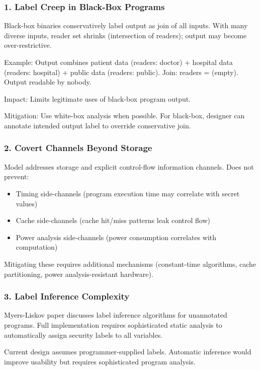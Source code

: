 \subsubsection{1. Label Creep in Black-Box Programs}

Black-box binaries conservatively label output as join of all inputs. With many diverse inputs, reader set shrinks (intersection of readers); output may become over-restrictive.

Example: Output combines patient data (readers: {doctor}) + hospital data (readers: {hospital}) + public data (readers: {public}). Join: readers = {} (empty). Output readable by nobody.

Impact: Limits legitimate uses of black-box program output.

Mitigation: Use white-box analysis when possible. For black-box, designer can annotate intended output label to override conservative join.

\subsubsection{2. Covert Channels Beyond Storage}

Model addresses storage and explicit control-flow information channels. Does not prevent:
\begin{itemize}
\item Timing side-channels (program execution time may correlate with secret values)
\item Cache side-channels (cache hit/miss patterns leak control flow)
\item Power analysis side-channels (power consumption correlates with computation)
\end{itemize}

Mitigating these requires additional mechanisms (constant-time algorithms, cache partitioning, power analysis-resistant hardware).

\subsubsection{3. Label Inference Complexity}

Myers-Liskov paper discusses label inference algorithms for unannotated programs. Full implementation requires sophisticated static analysis to automatically assign security labels to all variables.

Current design assumes programmer-supplied labels. Automatic inference would improve usability but requires sophisticated program analysis.

